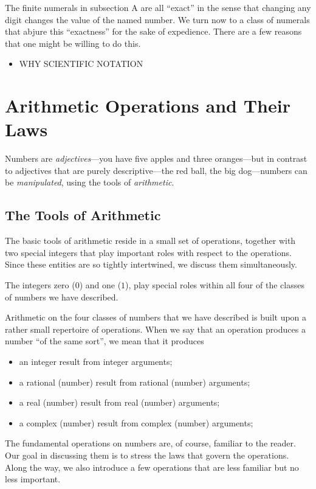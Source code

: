 The finite numerals in subsection A are all ``exact'' in the sense
that changing any digit changes the value of the named number.  We
turn now to a class of numerals that abjure this ``exactness'' for the
sake of expedience.  There are a few reasons that one might be willing
to do this.

\begin{itemize}
\item
WHY SCIENTIFIC NOTATION
\end{itemize}


\section{Arithmetic Operations and Their Laws}
\label{sec:Arithmetic-Tools+Laws}

Numbers are {\it adjectives}---you have
five apples and three oranges---but in contrast to adjectives that are
purely descriptive---the red ball, the big dog---numbers can be {\em
  manipulated}, using the
tools of {\it arithmetic}.

\subsection{The Tools of Arithmetic}
\label{sec:arithmetic-tools}

The basic tools of arithmetic reside in a small set of operations,
together with two special integers that play important roles with
respect to the operations.  Since these entities are so tightly
intertwined, we discuss them simultaneously.

\smallskip

%
The integers zero ($0$) and one
($1$), play special roles within all four of
the classes of numbers we have described.

\smallskip

%
Arithmetic on the four classes of numbers that we have described is
built upon a rather small repertoire of operations.  When we say that
an operation produces a number ``of the same sort'', we mean that it
produces
\begin{itemize}
\item
an integer result from integer arguments;
\item
a rational (number) result from rational (number) arguments;
\item
a real (number) result from real (number) arguments;
\item
a complex (number) result from complex (number) arguments;
\end{itemize}
The fundamental operations on numbers are, of course, familiar to the
reader.  Our goal in discussing them is to stress the laws that govern
the operations.  Along the way, we also introduce a few operations
that are less familiar but no less important.

